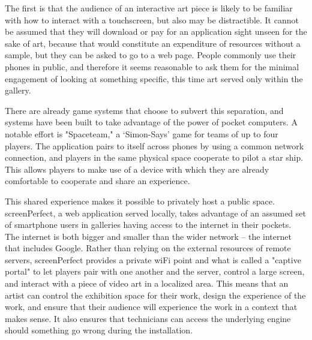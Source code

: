 The first is that the audience of an interactive art piece is likely to be familiar with how to interact with a touchscreen, but also may be distractible. It cannot be assumed that they will download or pay for an application sight unseen for the sake of art, because that would constitute an expenditure of resources without a sample, but they can be asked to go to a web page. People commonly use their phones in public, and therefore it seems reasonable to ask them for the minimal engagement of looking at something specific, this time art served only within the gallery. 

There are already game systems that choose to subvert this separation, and systems have been built to take advantage of the power of pocket computers. A notable effort is "Spaceteam," \parencite{spaceteam} a ‘Simon-Says' game for teams of up to four players. The application pairs to itself across phones by using a common network connection, and players in the same physical space cooperate to pilot a star ship. This allows players to make use of a device with which they are already comfortable to cooperate and share an experience.

This shared experience makes it possible to privately host a public space. screenPerfect, a web application served locally, takes advantage of an assumed set of smartphone users in galleries having access to the internet in their pockets. The internet is both bigger and smaller than the wider network – the internet that includes Google. Rather than relying on the external resources of remote servers, screenPerfect provides a private wiFi point and what is called a "captive portal" to let players pair with one another and the server, control a large screen, and interact with a piece of video art in a localized area. This means that an artist can control the exhibition space for their work, design the experience of the work, and ensure that their audience will experience the work in a context that makes sense. It also ensures that technicians can access the underlying engine should something go wrong during the installation.

